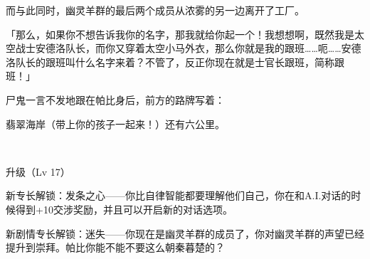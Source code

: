 而与此同时，幽灵羊群的最后两个成员从浓雾的另一边离开了工厂。

「那么，如果你不想告诉我你的名字，那我就给你起一个！我想想啊，既然我是太空战士安德洛队长，而你又穿着太空小马外衣，那么你就是我的跟班……呃……安德洛队长的跟班叫什么名字来着？不管了，反正你现在就是士官长跟班，简称跟班！」

尸鬼一言不发地跟在帕比身后，前方的路牌写着：

\begin{center}
翡翠海岸（带上你的孩子一起来！）还有六公里。    
\end{center}

~\vfill

\begin{note}
    升级（Lv 17）

    新专长解锁：发条之心——你比自律智能都要理解他们自己，你在和A.I.对话的时候得到+10交涉奖励，并且可以开启新的对话选项。

    新剧情专长解锁：迷失——你现在是幽灵羊群的成员了，你对幽灵羊群的声望已经提升到崇拜。帕比你能不能不要这么朝秦暮楚的？
\end{note}




